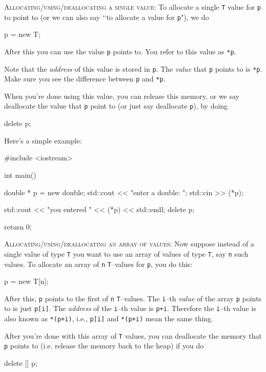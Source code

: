 \textsc{Allocating/using/deallocating a single value:}
To allocate a single \verb!T! value for \verb!p! to point to
(or we can also say \lq\lq to allocate a value for \verb!p!"),
we do
\begin{console}[frame=single]
p = new T;
\end{console}
After this you can use the value \verb!p! points to.
You refer to this value as \verb!*p!.

Note that the \textit{address} of this value is stored in \verb!p!.
The \textit{value} that \verb!p! points to is \verb!*p!.
Make sure you see the difference between \verb!p! and \verb!*p!.

When you're done using this value, you can release this memory, 
or we say deallocate the value that \verb!p! point to (or just say deallocate \verb!p!),
by doing
\begin{console}[frame=single,fontsize=\footnotesize]
delete p;
\end{console}
Here's a simple example:
\begin{console}[fontsize=\footnotesize]
#include <iostream>

int main()
{
    double * p = new double;
    std::cout << "enter a double: ";
    std::cin >> (*p);

    std::cout << "you entered " << (*p) << std::endl;
    delete p;

    return 0;
}
\end{console}

\textsc{Allocating/using/deallocating an array of values:}
Now suppose instead of a single value of type
\verb!T! you want to use an array of values
of type \verb!T!, say \verb!n! such values.
To allocate an array of \verb!n! 
\verb!T!--values for \verb!p!, you do this:
\begin{console}[frame=single,fontsize=\footnotesize]
p = new T[n];
\end{console}
After this, \verb!p! points to the first of \verb!n!
\verb!T!--values.
The \verb!i!--th \textit{value} of the 
array \verb!p! points to is just
\verb!p[i]!.
The \textit{address} of the
\verb!i!--th value is \verb!p+i!.
Therefore the \verb!i!--th value is also
known as \verb!*(p+i)!, i.e.,
\verb!p[i]!
and
\verb!*(p+i)!
mean the same thing.

After you're done with this array of \verb!T!
values, you can deallocate the memory that \verb!p! points to
(i.e. release the memory back to the heap)
if you do
\begin{console}[frame=single,fontsize=\footnotesize]
delete [] p;
\end{console}

